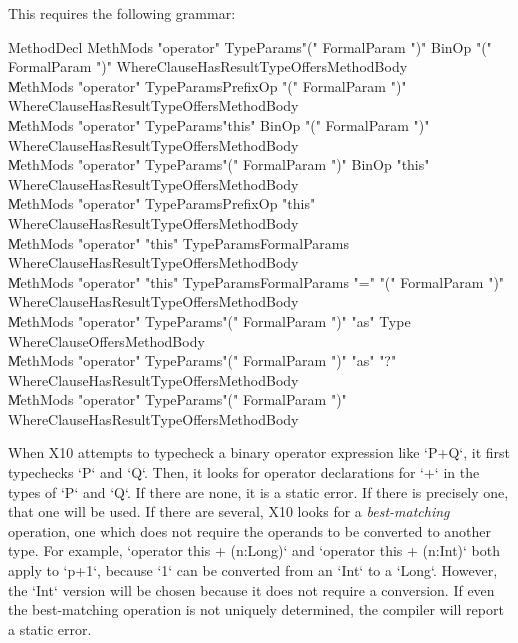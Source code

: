 This requires the following grammar: \\
\begin{bbgrammar}
 MethodDecl    \: MethMods \xcd"operator" TypeParams\opt \xcd"(" FormalParam  \xcd")" BinOp \xcd"(" FormalParam  \xcd")" WhereClause\opt HasResultType\opt Offers\opt MethodBody\\
    \| MethMods \xcd"operator" TypeParams\opt PrefixOp \xcd"(" FormalParam  \xcd")" WhereClause\opt HasResultType\opt Offers\opt MethodBody\\
    \| MethMods \xcd"operator" TypeParams\opt \xcd"this" BinOp \xcd"(" FormalParam  \xcd")" WhereClause\opt HasResultType\opt Offers\opt MethodBody\\
    \| MethMods \xcd"operator" TypeParams\opt \xcd"(" FormalParam  \xcd")" BinOp \xcd"this" WhereClause\opt HasResultType\opt Offers\opt MethodBody\\
    \| MethMods \xcd"operator" TypeParams\opt PrefixOp \xcd"this" WhereClause\opt HasResultType\opt Offers\opt MethodBody\\
    \| MethMods \xcd"operator" \xcd"this" TypeParams\opt FormalParams WhereClause\opt HasResultType\opt Offers\opt MethodBody\\
    \| MethMods \xcd"operator" \xcd"this" TypeParams\opt FormalParams \xcd"=" \xcd"(" FormalParam  \xcd")" WhereClause\opt HasResultType\opt Offers\opt MethodBody\\
    \| MethMods \xcd"operator" TypeParams\opt \xcd"(" FormalParam  \xcd")" \xcd"as" Type WhereClause\opt Offers\opt MethodBody\\
    \| MethMods \xcd"operator" TypeParams\opt \xcd"(" FormalParam  \xcd")" \xcd"as" \xcd"?" WhereClause\opt HasResultType\opt Offers\opt MethodBody\\
    \| MethMods \xcd"operator" TypeParams\opt \xcd"(" FormalParam  \xcd")" WhereClause\opt HasResultType\opt Offers\opt MethodBody\\

\end{bbgrammar}
When X10 attempts to typecheck a binary operator expression like \xcd`P+Q`, it
first typechecks \xcd`P` and \xcd`Q`. Then, it looks for operator declarations
for \xcd`+` in the types of \xcd`P` and \xcd`Q`. If there are none, it is a
static error. If there is precisely one, that one will be used. If there are
several, X10 looks for a {\em best-matching} operation, \viz{} one which does
not require the operands to be converted to another type. For example,
\xcd`operator this + (n:Long)` and \xcd`operator this + (n:Int)` both apply to
\xcd`p+1`, because \xcd`1` can be converted from an \xcd`Int` to a \xcd`Long`.
However, the \xcd`Int` version will be chosen because it does not require a
conversion. If even the best-matching operation is not uniquely determined,
the compiler will report a static error.

